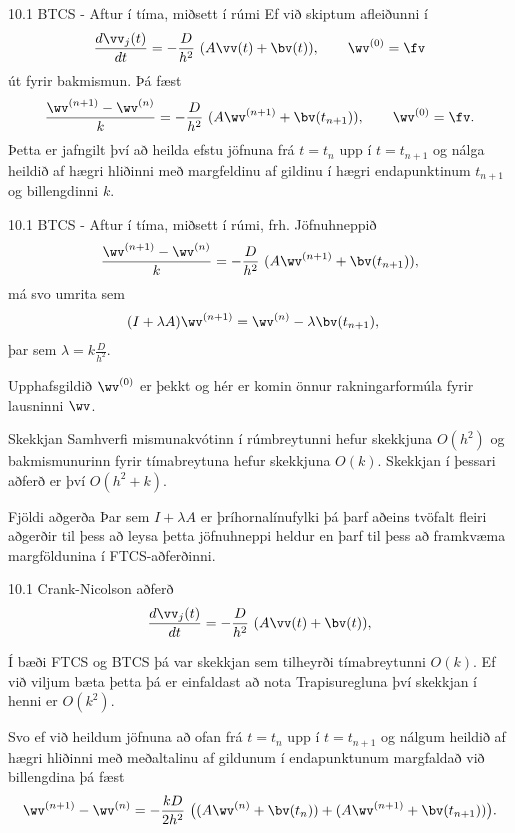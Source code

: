 \begin{frame}{10.1 BTCS - Aftur í tíma, miðsett í rúmi}
Ef við skiptum afleiðunni í 
$$ 
 \frac{d \vv_j(t)}{d t} =  -\frac{D}{h^2}\  (A\vv(t) + \bv(t)), \qquad \wv^{(0)}=\fv
$$
út fyrir bakmismun. Þá fæst
$$ 
 \frac{\wv^{(n+1)} - \wv^{(n)}}{ k} =  -\frac{D}{h^2}\  (A\wv^{(n+1)} + \bv(t_{n+1})), 
 \qquad \wv^{(0)}=\fv.
$$\pause
Þetta er jafngilt því að heilda efstu jöfnuna frá $t=t_n$ upp í $t=t_{n+1}$ og
nálga heildið af hægri hliðinni með margfeldinu af gildinu í hægri endapunktinum 
$t_{n+1}$ og billengdinni $k$. \pause

\end{frame}
 
\begin{frame}{10.1 BTCS - Aftur í tíma, miðsett í rúmi, frh.}
 Jöfnuhneppið
 $$ 
 \frac{\wv^{(n+1)} - \wv^{(n)}}{ k} =  -\frac{D}{h^2}\  (A\wv^{(n+1)} + \bv(t_{n+1})), 
$$
má svo umrita sem
\begin{align*}
 (I+\lambda A)\wv^{(n+1)} &= \wv^{(n)}  - \lambda \bv(t_{n+1}), 
\end{align*}
þar sem $\lambda = k\frac{D}{h^2}$. \pause
 
 Upphafsgildið $\wv^{(0)}$ er þekkt og hér er komin önnur rakningarformúla
 fyrir lausninni $\wv$.  \pause
 
 \begin{block}{Skekkjan}
  Samhverfi mismunakvótinn í rúmbreytunni hefur skekkjuna
 $O(h^2)$ og bakmismunurinn fyrir tímabreytuna hefur skekkjuna $O(k)$. 
 Skekkjan í þessari aðferð er því $O(h^2 + k)$.
 \end{block}
 
 \begin{block}{Fjöldi aðgerða}
  Þar sem $I+\lambda A$ er þríhornalínufylki þá þarf aðeins tvöfalt fleiri
  aðgerðir til þess að leysa þetta jöfnuhneppi heldur en þarf til þess að framkvæma margföldunina
  í FTCS-aðferðinni.
 \end{block}

 
 \end{frame}
 
\begin{frame}{10.1 Crank-Nicolson aðferð}
$$ 
 \frac{d \vv_j(t)}{d t} =  -\frac{D}{h^2}\  (A\vv(t) + \bv(t)),
$$

Í bæði FTCS og BTCS þá var skekkjan sem tilheyrði tímabreytunni $O(k)$.
Ef við viljum bæta þetta þá er einfaldast að nota Trapisuregluna
því skekkjan í henni er $O(k^2)$. \pause 

Svo ef við heildum jöfnuna að ofan frá $t=t_n$ upp í $t=t_{n+1}$ og
nálgum heildið af hægri hliðinni með meðaltalinu af gildunum í endapunktunum
margfaldað við billengdina
þá fæst
$$ 
 \wv^{(n+1)} - \wv^{(n)} =  -\frac{kD}{2h^2}\  
 \big( (A\wv^{(n)} + \bv(t_{n})) +  
 (A\wv^{(n+1)} + \bv(t_{n+1})) \big).
$$
\end{frame}
 
